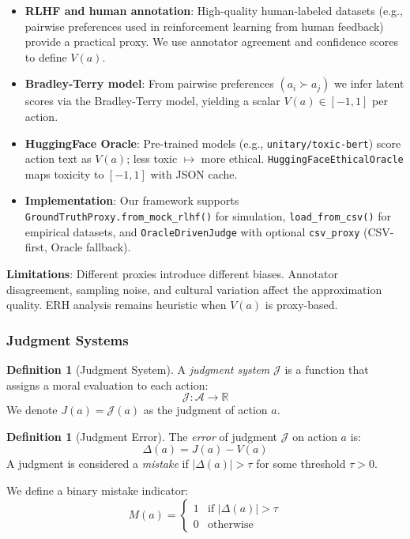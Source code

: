 \documentclass[12pt,a4paper]{article}
\theoremstyle{definition}
\newtheorem{definition}[theorem]{Definition}
\theoremstyle{remark}
\begin{document}
\begin{itemize}
    \item \textbf{RLHF and human annotation}: High-quality human-labeled datasets (e.g., pairwise preferences used in reinforcement learning from human feedback) provide a practical proxy. We use annotator agreement and confidence scores to define $V(a)$.
    \item \textbf{Bradley-Terry model}: From pairwise preferences $(a_i \succ a_j)$ we infer latent scores via the Bradley-Terry model, yielding a scalar $V(a) \in [-1, 1]$ per action.
    \item \textbf{HuggingFace Oracle}: Pre-trained models (e.g., \texttt{unitary/toxic-bert}) score action text as $V(a)$; less toxic $\mapsto$ more ethical. \texttt{HuggingFaceEthicalOracle} maps toxicity to $[-1,1]$ with JSON cache.
    \item \textbf{Implementation}: Our framework supports \texttt{GroundTruthProxy.from\_mock\_rlhf()} for simulation, \texttt{load\_from\_csv()} for empirical datasets, and \texttt{OracleDrivenJudge} with optional \texttt{csv\_proxy} (CSV-first, Oracle fallback).
\end{itemize}

\textbf{Limitations}: Different proxies introduce different biases. Annotator disagreement, sampling noise, and cultural variation affect the approximation quality. ERH analysis remains heuristic when $V(a)$ is proxy-based.

\subsubsection{Judgment Systems}

\begin{definition}[Judgment System]
A \emph{judgment system} $\mathcal{J}$ is a function that assigns a moral evaluation to each action:
\[
\mathcal{J}: \mathcal{A} \to \mathbb{R}
\]
We denote $J(a) = \mathcal{J}(a)$ as the judgment of action $a$.
\end{definition}

\begin{definition}[Judgment Error]
The \emph{error} of judgment $\mathcal{J}$ on action $a$ is:
\[
\Delta(a) = J(a) - V(a)
\]
A judgment is considered a \emph{mistake} if $|\Delta(a)| > \tau$ for some threshold $\tau > 0$.
\end{definition}

We define a binary mistake indicator:
\[
M(a) = \begin{cases}
1 & \text{if } |\Delta(a)| > \tau \\
0 & \text{otherwise}
\end{cases}
\]
\end{document}
